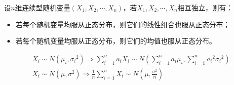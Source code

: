 \begin{theorem}
设$n$维连续型随机变量$\left( X_1,X_2,\cdots ,X_n \right) $，若$X_1,X_2,\cdots ,X_n$相互独立，则有：
\begin{itemize}
    \item 若每个随机变量均服从正态分布，则它们的线性组合也服从正态分布；
    \item 若每个随机变量均服从正态分布，则它们的均值也服从正态分布。
\end{itemize}
\begin{align*}
&X_i\sim N\left( \mu _i,{\sigma _i}^2 \right) \Rightarrow \sum_{i=1}^n{a_iX_i}\sim N\left( \sum_{i=1}^n{a_i\mu _i},\sum_{i=1}^n{{a_i}^2{\sigma _i}^2} \right) \\
&X_i\sim N\left( \mu ,\sigma ^2 \right) \Rightarrow \frac{1}{n}\sum_{i=1}^n{X_i}\sim N\left( \mu ,\frac{\sigma ^2}{n} \right)
\end{align*}
\end{theorem}




